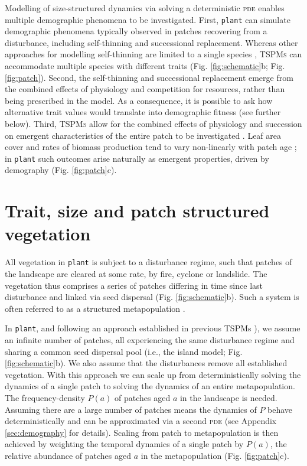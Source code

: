 \documentclass[a4paper,11pt]{article}
\newcommand{\plant}{\texttt{plant}}
\begin{document}
Modelling of size-structured dynamics via solving a deterministic
\textsc{pde} enables multiple demographic phenomena to be
investigated. First, {\plant} can simulate demographic
phenomena typically observed in patches
recovering from a disturbance, including self-thinning and
successional replacement. Whereas other approaches for modelling
self-thinning are limited to a single species
\citep[e.g.][]{Barnes-2004, Coomes-2007}, \textsc{TSPMs} can accommodate
multiple species with different traits (Fig. \ref{fig:schematic}b;
Fig.  \ref{fig:patch}). Second, the self-thinning and
successional replacement emerge from the
combined effects of physiology and competition for resources, rather
than being prescribed in the model. As a consequence, it is possible to ask how alternative trait values would translate into demographic fitness (see further below). Third,  \textsc{TSPMs} allow for the combined effects of physiology and succession on emergent
characteristics of the entire patch to be investigated
\citep{Moorcroft-2001, Falster-2011}. Leaf area cover and rates of biomass
production tend to vary  non-linearly with patch
age \citep{Smith-2001, Binkley-2002, Ogawa-2010};
in {\plant} such outcomes arise naturally as emergent properties,
driven by demography (Fig. \ref{fig:patch}c).

\section{Trait, size and patch structured vegetation}

All vegetation in {\plant} is subject to a disturbance regime, such that patches
of the landscape are cleared at some rate, by fire, cyclone or
landslide.  The vegetation thus comprises a series of patches
differing in time since last disturbance and linked via seed dispersal
(Fig.  \ref{fig:schematic}b). Such a system is often referred to as a
structured metapopulation \citep{Gyllenberg-2001}.

In {\plant}, and following an approach established in previous TSPMs
\citep{Kohyama-1993, Moorcroft-2001, Falster-2011}),
we assume an infinite number of patches, all experiencing
the same disturbance regime and sharing a common seed dispersal pool
(i.e., the island model; Fig. \ref{fig:schematic}b). We also assume
that the disturbances remove all established vegetation.  With this
approach we can scale up from deterministically solving the dynamics of
a single patch to solving the dynamics of an entire metapopulation.
The frequency-density \(P(a)\) of patches aged
\(a\) in the landscape is needed. Assuming there are a large number of
patches means the dynamics of \(P\) behave deterministically and can
be approximated via a second \textsc{pde} (see Appendix
\ref{sec:demography} for details). Scaling from patch to
metapopulation is then achieved by weighting the temporal dynamics of
a single patch by \(P(a)\), the relative abundance of patches aged
\(a\) in the metapopulation (Fig. \ref{fig:patch}c).
\end{document}
